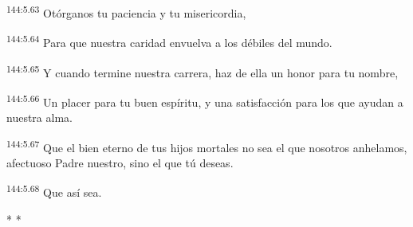 \begin{center}
\par 
\textsuperscript{144:5.63} Otórganos tu paciencia y tu misericordia,

\par 
\textsuperscript{144:5.64} Para que nuestra caridad envuelva a los débiles del mundo.

\par 
\textsuperscript{144:5.65} Y cuando termine nuestra carrera, haz de ella un honor para tu nombre,

\par 
\textsuperscript{144:5.66} Un placer para tu buen espíritu, y una satisfacción para los que ayudan a nuestra alma.

\par 
\textsuperscript{144:5.67} Que el bien eterno de tus hijos mortales no sea el que nosotros anhelamos, afectuoso Padre nuestro, sino el que tú deseas.

\par 
\textsuperscript{144:5.68} Que así sea.
\end{center}

\begin{center}
	\par * * *
\end{center}

